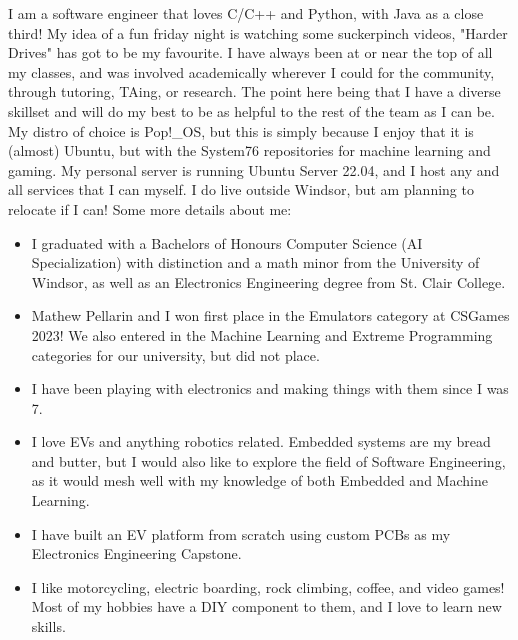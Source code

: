 I am a software engineer that loves C/C++ and Python, with Java as a close third! My idea of a fun friday night is watching some suckerpinch videos, "Harder Drives" has got to be my favourite. I have always been at or near the top of all my classes, and was involved academically wherever I could for the community, through tutoring, TAing, or research. The point here being that I have a diverse skillset and will do my best to be as helpful to the rest of the team as I can be. My distro of choice is Pop!\_OS, but this is simply because I enjoy that it is (almost) Ubuntu, but with the System76 repositories for machine learning and gaming. My personal server is running Ubuntu Server 22.04, and I host any and all services that I can myself. I do live outside Windsor, but am planning to relocate if I can! Some more details about me:

\begin{itemize}
  \item I graduated with a Bachelors of Honours Computer Science (AI Specialization) with distinction and a math minor from the University of Windsor, as well as an Electronics Engineering degree from St. Clair College.
  \item Mathew Pellarin and I won first place in the Emulators category at CSGames 2023! We also entered in the Machine Learning and Extreme Programming categories for our university, but did not place.
  \item I have been playing with electronics and making things with them since I was 7.
  \item I love EVs and anything robotics related. Embedded systems are my bread and butter, but I would also like to explore the field of Software Engineering, as it would mesh well with my knowledge of both Embedded and Machine Learning.
  \item I have built an EV platform from scratch using custom PCBs as my Electronics Engineering Capstone.
  \item I like motorcycling, electric boarding, rock climbing, coffee, and video games! Most of my hobbies have a DIY component to them, and I love to learn new skills.
\end{itemize}

